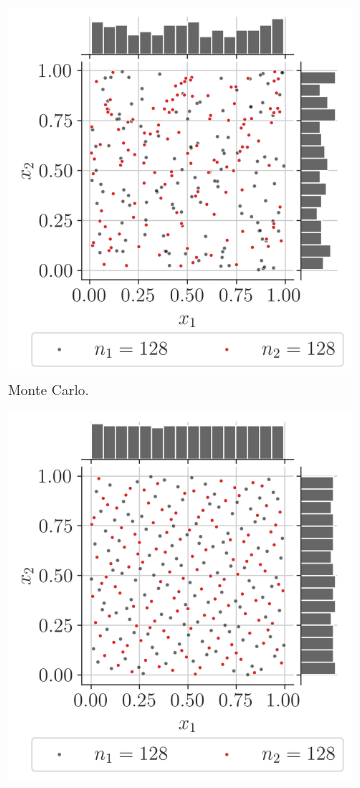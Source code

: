 \begin{figure}[ht]
    \centering
    \begin{subfigure}[b]{0.32\textwidth}
        \centering
        \includegraphics[width=\textwidth]{../numerical_experiments/chapter1/figures/MonteCarlo256.png}
        \caption{Monte Carlo.}
    \end{subfigure}
    \hfill
    \begin{subfigure}[b]{0.32\textwidth}
        \centering
        \includegraphics[width=\textwidth]{../numerical_experiments/chapter1/figures/quasi_MonteCarlo_Halton_256.png}

\end{subfigure}
\end{figure}
